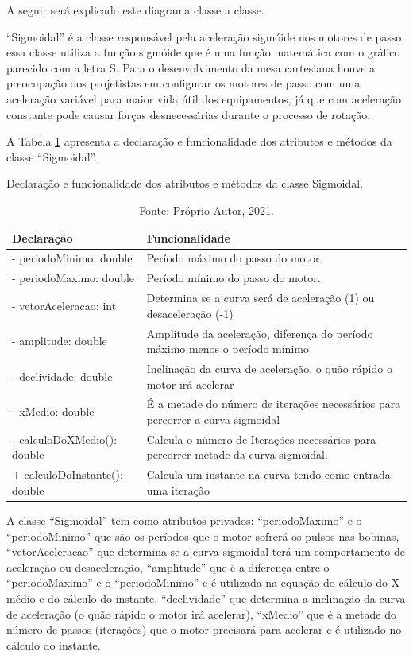 A seguir será explicado este diagrama classe a classe.

“Sigmoidal” é a classe responsável pela aceleração sigmóide nos motores de passo, essa classe utiliza 
a função sigmóide que é uma função matemática com o gráfico parecido com a letra S. Para o desenvolvimento 
da mesa cartesiana houve a preocupação dos projetistas em configurar os motores de passo com uma aceleração 
variável para maior vida útil dos equipamentos, já que com aceleração constante pode causar forças 
desnecessárias durante o processo de rotação.

A Tabela \ref{tab:classesigmoidal} apresenta a declaração e funcionalidade dos atributos e métodos 
da classe “Sigmoidal”.

\begin{table}[!htb]
    \centering
    \caption{Declaração e funcionalidade dos atributos e métodos da classe Sigmoidal.}
    \begin{tabular}{lp{9cm}}
        \hline
        \textbf{Declaração} & \textbf{Funcionalidade}\\
        \hline
        - periodoMinimo: double & Período máximo do passo do motor.\\
        - periodoMaximo: double & Período mínimo do passo do motor.\\
        - vetorAceleracao: int & Determina se a curva será de aceleração (1) ou desaceleração (-1)\\
        - amplitude: double & Amplitude da aceleração, diferença do período máximo menos o período mínimo\\
        - declividade: double & Inclinação da curva de aceleração, o quão rápido o motor irá acelerar\\
        - xMedio: double & É a metade do número de iterações necessários para percorrer a curva sigmoidal\\
        - calculoDoXMedio(): double & Calcula o número de Iterações necessários para percorrer metade da curva sigmoidal.\\
        + calculoDoInstante(): double & Calcula um instante na curva tendo como entrada uma iteração\\
        \hline       
    \end{tabular}
    \caption*{Fonte: Próprio Autor, 2021.}
    \label{tab:classesigmoidal}
\end{table}

A classe “Sigmoidal” tem como atributos privados: “periodoMaximo” e o “periodoMinimo” que são os períodos 
que o motor sofrerá os pulsos nas bobinas, “vetorAceleracao” que determina se a curva sigmoidal terá 
um comportamento de aceleração ou desaceleração, “amplitude” que é a diferença entre o “periodoMaximo” 
e o “periodoMinimo” e é utilizada na equação do cálculo do X médio e do cálculo do instante, “declividade” 
que determina a inclinação da curva de aceleração (o quão rápido o motor irá acelerar), “xMedio” que é a 
metade do número de passos (iterações) que o motor precisará para acelerar e é utilizado no cálculo 
do instante. 

